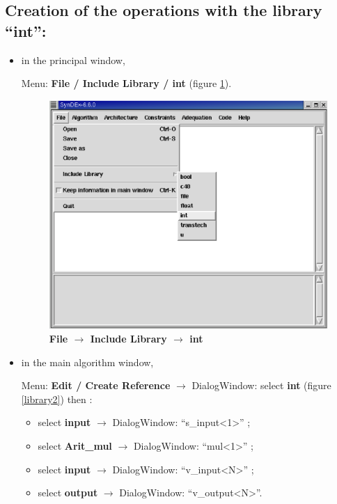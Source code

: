 \documentclass[a4paper,twoside]{report}
\begin{document}
\subsection{Creation of the operations with the library ``int'':}
\begin{itemize}
\item in the principal window, 

Menu: \textbf{File / Include Library / int} (figure \ref{library}).

\begin{figure}[htbp]
  \begin{center} 
        \includegraphics[width=0.6\linewidth]{File_IncludeLibrary_int.eps} 
  \end{center}
  \caption{\textbf{File $\rightarrow$ Include Library $\rightarrow$ int}}
  \label{library}
\end{figure}
\item in the main algorithm window,

Menu: \textbf{Edit / Create Reference} $\rightarrow$ DialogWindow: select
\textbf{int} (figure \ref{library2}) then :

\begin{itemize}
\item select \textbf{input} $\rightarrow$ DialogWindow: ``s\_input<1>'' ;
\item select \textbf{Arit\_mul} $\rightarrow$ DialogWindow: ``mul<1>'' ;
\item select \textbf{input} $\rightarrow$ DialogWindow: ``v\_input<N>'' ; 
\item select \textbf{output} $\rightarrow$ DialogWindow: ``v\_output<N>''.
\end{itemize}


\end{itemize}
\end{document}
